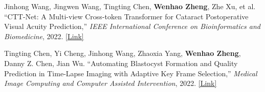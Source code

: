 \begin{cventries}
{\begin{cvitemize2}
            \item Jinhong Wang, Jingwen Wang, Tingting Chen, \textbf{Wenhao Zheng}, Zhe Xu, et al. ``CTT-Net: A Multi-view Cross-token Transformer for Cataract Postoperative Visual Acuity Prediction,'' \textit{IEEE International Conference on Bioinformatics and Biomedicine}, 2022. \href{https://ieeexplore.ieee.org/document/9995392}{\textcolor{link}{[Link]}}
            \vspace{1mm}
            \item Tingting Chen, Yi Cheng, Jinhong Wang, Zhaoxia Yang, \textbf{Wenhao Zheng}, Danny Z. Chen, Jian Wu. ``Automating Blastocyst Formation and Quality Prediction in Time-Lapse Imaging with Adaptive Key Frame Selection,'' \textit{Medical Image Computing and Computer Assisted Intervention}, 2022. \href{https://link.springer.com/chapter/10.1007/978-3-031-16440-8_43}{\textcolor{link}{[Link]}}
        \end{cvitemize2}
    }
\end{cventries}
